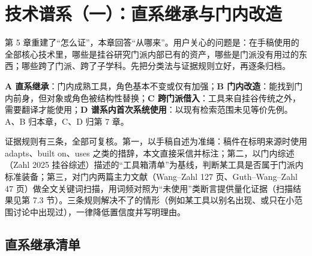 \section{技术谱系（一）：直系继承与门内改造}

第 5 章重建了“怎么证”，本章回答“从哪来”。用户关心的问题是：在手稿使用的全部核心技术里，哪些是挂谷研究门派内部已有的资产，哪些是门派没有用过的东西；哪些跨了门派、跨了子学科。先把分类法与证据规则立好，再逐条归档。

\begin{keybox}[四分类法]
\textbf{A 直系继承}：门内成熟工具，角色基本不变或仅有加强；\textbf{B 门内改造}：能找到门内前身，但对象或角色被结构性替换；\textbf{C 跨门派借入}：工具来自挂谷传统之外，需要翻译才能使用；\textbf{D 谱系内首次系统使用}：以现有检索范围未见等价先例。A、B 归本章，C、D 归第 7 章。
\end{keybox}

证据规则有三条，全部可复核。第一，以手稿自述为准绳：稿件在标明来源时使用 adapts、built on、uses 之类的措辞，本文直接采信并标注；第二，以门内综述（Zahl 2025 挂谷综述）描述的“工具箱清单”为基线，判断某工具是否属于门派内标准装备；第三，对门内两篇主力文献（Wang--Zahl 127 页、Guth--Wang--Zahl 47 页）做全文关键词扫描，用词频对照为“未使用”类断言提供量化证据（扫描结果见第 7.3 节）。三条规则解决不了的情形（例如某工具以别名出现、或只在小范围讨论中出现过），一律降低置信度并写明理由。

\subsection{直系继承清单}

